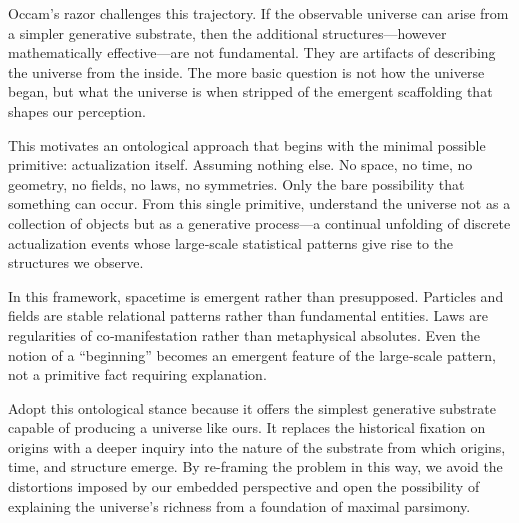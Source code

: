 \documentclass[11pt,letterpaper]{article}
\begin{document}
Occam’s razor challenges this trajectory. If the observable universe can arise from a simpler generative substrate, then the additional structures—however mathematically effective—are not fundamental. They are artifacts of describing the universe from the inside. The more basic question is not how the universe began, but what the universe is when stripped of the emergent scaffolding that shapes our perception.

This motivates an ontological approach that begins with the minimal possible primitive: actualization itself. Assuming nothing else. No space, no time, no geometry, no fields, no laws, no symmetries. Only the bare possibility that something can occur. From this single primitive, understand the universe not as a collection of objects but as a generative process—a continual unfolding of discrete actualization events whose large‑scale statistical patterns give rise to the structures we observe.

In this framework, spacetime is emergent rather than presupposed. Particles and fields are stable relational patterns rather than fundamental entities. Laws are regularities of co‑manifestation rather than metaphysical absolutes. Even the notion of a “beginning” becomes an emergent feature of the large‑scale pattern, not a primitive fact requiring explanation.

Adopt this ontological stance because it offers the simplest generative substrate capable of producing a universe like ours. It replaces the historical fixation on origins with a deeper inquiry into the nature of the substrate from which origins, time, and structure emerge. By re-framing the problem in this way, we avoid the distortions imposed by our embedded perspective and open the possibility of explaining the universe’s richness from a foundation of maximal parsimony.
\end{document}
